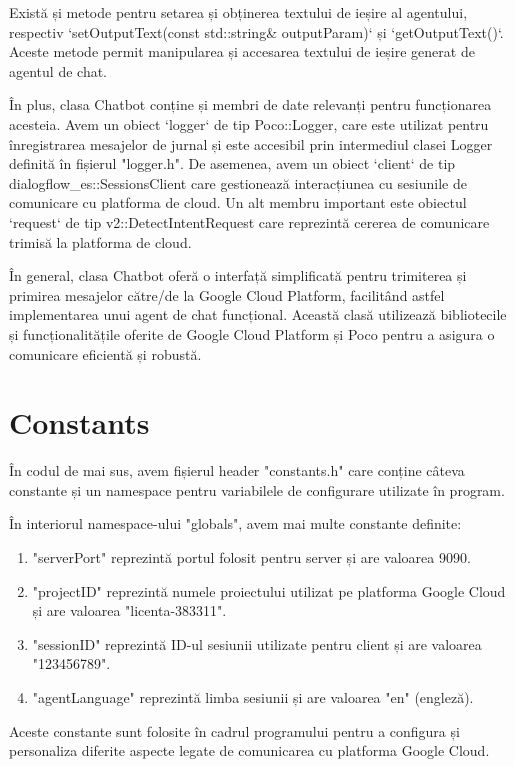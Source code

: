 Există și metode pentru setarea și obținerea textului de ieșire al agentului, respectiv `setOutputText(const std::string\& outputParam)` și `getOutputText()`. Aceste metode permit manipularea și accesarea textului de ieșire generat de agentul de chat.

În plus, clasa Chatbot conține și membri de date relevanți pentru funcționarea acesteia. Avem un obiect `logger` de tip Poco::Logger, care este utilizat pentru înregistrarea mesajelor de jurnal și este accesibil prin intermediul clasei Logger definită în fișierul "logger.h". De asemenea, avem un obiect `client` de tip dialogflow\_es::SessionsClient care gestionează interacțiunea cu sesiunile de comunicare cu platforma de cloud. Un alt membru important este obiectul `request` de tip v2::DetectIntentRequest care reprezintă cererea de comunicare trimisă la platforma de cloud.

În general, clasa Chatbot oferă o interfață simplificată pentru trimiterea și primirea mesajelor către/de la Google Cloud Platform, facilitând astfel implementarea unui agent de chat funcțional. Această clasă utilizează bibliotecile și funcționalitățile oferite de Google Cloud Platform și Poco pentru a asigura o comunicare eficientă și robustă.

\section{Constants}

În codul de mai sus, avem fișierul header "constants.h" care conține câteva constante și un namespace pentru variabilele de configurare utilizate în program.

În interiorul namespace-ului "globals", avem mai multe constante definite:
\begin{enumerate}
    \item "serverPort" reprezintă portul folosit pentru server și are valoarea 9090.
    \item "projectID" reprezintă numele proiectului utilizat pe platforma Google Cloud și are valoarea "licenta-383311".
    \item "sessionID" reprezintă ID-ul sesiunii utilizate pentru client și are valoarea "123456789".
    \item "agentLanguage" reprezintă limba sesiunii și are valoarea "en" (engleză).
\end{enumerate}

Aceste constante sunt folosite în cadrul programului pentru a configura și personaliza diferite aspecte legate de comunicarea cu platforma Google Cloud.

